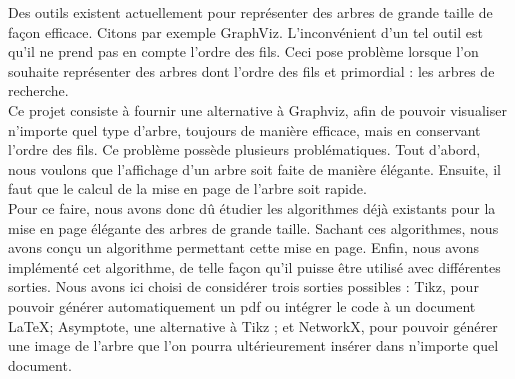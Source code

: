 Des outils existent actuellement pour représenter des arbres de grande taille de façon efficace. Citons par exemple GraphViz. L'inconvénient d'un tel outil est qu'il ne prend pas en compte l'ordre des fils. Ceci pose problème lorsque l'on souhaite représenter des arbres dont l'ordre des fils et primordial : les arbres de recherche.\\
Ce projet consiste à fournir une alternative à Graphviz, afin de pouvoir visualiser n'importe quel type d'arbre, toujours de manière efficace, mais en conservant l'ordre des fils. Ce problème possède plusieurs problématiques. Tout d'abord, nous voulons que l'affichage d'un arbre soit faite de manière élégante. Ensuite, il faut que le calcul de la mise en page de l'arbre soit rapide.\\
Pour ce faire, nous avons donc d\^u étudier les algorithmes déjà existants pour la mise en page élégante des arbres de grande taille. Sachant ces algorithmes, nous avons conçu un algorithme permettant cette mise en page. Enfin, nous avons implémenté cet algorithme, de telle façon qu'il puisse \^etre utilisé avec différentes sorties. Nous avons ici choisi de considérer trois sorties possibles : Tikz, pour pouvoir générer automatiquement un pdf ou intégrer le code à un document \LaTeX ; Asymptote, une alternative à Tikz ; et NetworkX, pour pouvoir générer une image de l'arbre que l'on pourra ultérieurement insérer dans n'importe quel document.
